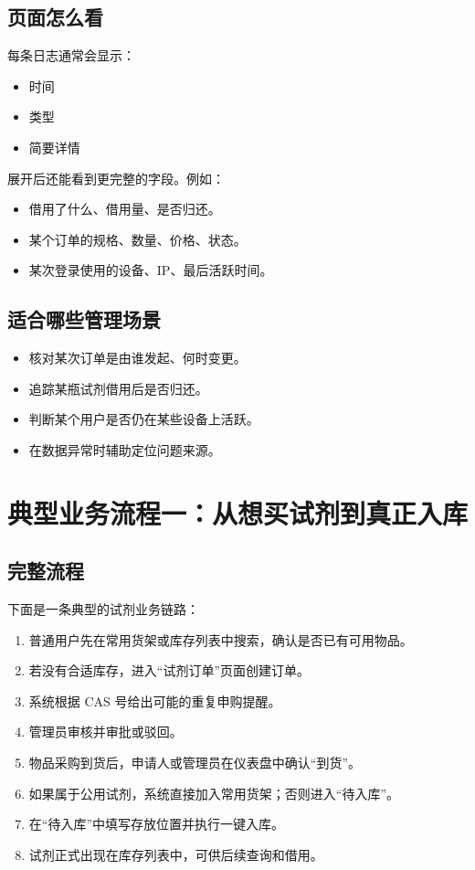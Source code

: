 \documentclass[12pt,a4paper]{ctexart}
\begin{document}
\subsection{页面怎么看}
每条日志通常会显示：
\begin{itemize}
  \item 时间
  \item 类型
  \item 简要详情
\end{itemize}

展开后还能看到更完整的字段。例如：
\begin{itemize}
  \item 借用了什么、借用量、是否归还。
  \item 某个订单的规格、数量、价格、状态。
  \item 某次登录使用的设备、IP、最后活跃时间。
\end{itemize}

\subsection{适合哪些管理场景}
\begin{itemize}
  \item 核对某次订单是由谁发起、何时变更。
  \item 追踪某瓶试剂借用后是否归还。
  \item 判断某个用户是否仍在某些设备上活跃。
  \item 在数据异常时辅助定位问题来源。
\end{itemize}

\newpage
\section{典型业务流程一：从想买试剂到真正入库}

\subsection{完整流程}
下面是一条典型的试剂业务链路：
\begin{enumerate}
  \item 普通用户先在常用货架或库存列表中搜索，确认是否已有可用物品。
  \item 若没有合适库存，进入“试剂订单”页面创建订单。
  \item 系统根据 CAS 号给出可能的重复申购提醒。
  \item 管理员审核并审批或驳回。
  \item 物品采购到货后，申请人或管理员在仪表盘中确认“到货”。
  \item 如果属于公用试剂，系统直接加入常用货架；否则进入“待入库”。
  \item 在“待入库”中填写存放位置并执行一键入库。
  \item 试剂正式出现在库存列表中，可供后续查询和借用。
\end{enumerate}
\end{document}
